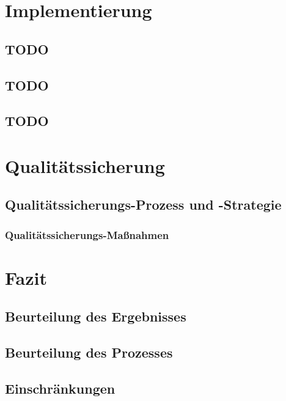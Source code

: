 \documentclass[10pt]{article}
\begin{document}
\section{Implementierung}
\subsection{TODO}
\subsection{TODO}
\subsection{TODO}

\section{Qualitätssicherung}
\subsection{Qualitätssicherungs-Prozess und -Strategie}
\subsubsection{Qualitätssicherungs-Maßnahmen}

\section{Fazit}
\subsection{Beurteilung des Ergebnisses}
\subsection{Beurteilung des Prozesses}
\subsection{Einschränkungen} %
\end{document}
